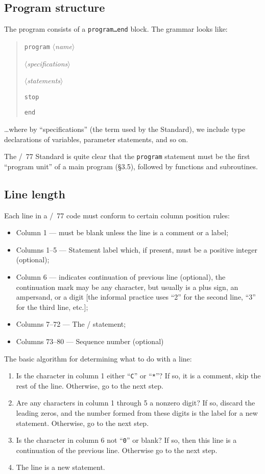 \subsection{Program structure}
The program consists of a \texttt{program\dots end} block. The grammar
looks like:

\begin{quotation}
\noindent\texttt{program} $\langle$\textit{name\/}$\rangle$

$\langle$\textit{specifications\/}$\rangle$

$\langle$\textit{statements\/}$\rangle$

\noindent\texttt{stop}

\noindent\texttt{end}
\end{quotation}
\dots where by ``specifications'' (the term used by the Standard), we
include type declarations of variables, parameter statements, and so on.

The \FORTRAN/~77 Standard is quite clear that the \texttt{program}
statement must be the first ``program unit'' of a main program (\S3.5),
followed by functions and subroutines.

\subsection{Line length}
Each line in a \FORTRAN/~77 code must conform to certain column position
rules:
\begin{itemize}
\item Column 1 --- must be blank unless the line is a comment or a label;
\item Columns 1--5 --- Statement label which, if present, must be a
  positive integer (optional);
\item Column 6 --- indicates continuation of previous line (optional),
  the continuation mark may be any character, but usually is a plus
  sign, an ampersand, or a digit [the informal practice uses
  ``2'' for the second line, ``3'' for the third line, etc.];
\item Columns 7--72 --- The \FORTRAN/ statement;
\item Columns 73--80 --- Sequence number (optional)
\end{itemize}
The basic algorithm for determining what to do with a line:
\begin{enumerate}
\item Is the character in column 1 either ``\texttt{C}'' or
  ``\texttt{*}''? If so, it is a comment, skip the rest of the
  line. Otherwise, go to the next step.
\item Are any characters in column 1 through 5 a nonzero digit? If so,
  discard the leading zeros, and the number formed from these digits is
  the label for a new statement. Otherwise, go to the next step.
\item Is the character in column 6 not ``\texttt{0}'' or blank? If so,
  then this line is a continuation of the previous line. Otherwise go to
  the next step.
\item The line is a new statement.
\end{enumerate}


